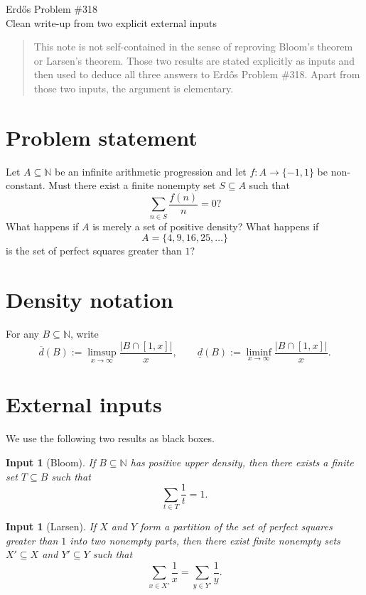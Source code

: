 \documentclass[11pt]{article}
\newtheorem{inputthm}[theorem]{Input}
\newcommand{\N}{\mathbb{N}}
\newcommand{\overd}{\overline d}
\newcommand{\underd}{\underline d}
\begin{document}
\begin{center}
{\LARGE Erd\H{o}s Problem \#318}\\[0.5em]
{\large Clean write-up from two explicit external inputs}
\end{center}

\begin{quote}
\small
This note is not self-contained in the sense of reproving Bloom's theorem or Larsen's theorem.
Those two results are stated explicitly as inputs and then used to deduce all three answers to
Erd\H{o}s Problem \#318. Apart from those two inputs, the argument is elementary.
\end{quote}

\section*{Problem statement}
Let $A\subseteq \N$ be an infinite arithmetic progression and let $f\colon A\to\{-1,1\}$ be non-constant.
Must there exist a finite nonempty set $S\subseteq A$ such that
\[
\sum_{n\in S}\frac{f(n)}{n}=0?
\]
What happens if $A$ is merely a set of positive density? What happens if
\[
A=\{4,9,16,25,\dots\}
\]
is the set of perfect squares greater than $1$?

\section*{Density notation}
For any $B\subseteq \N$, write
\[
\overd(B):=\limsup_{x\to\infty}\frac{|B\cap[1,x]|}{x},
\qquad
\underd(B):=\liminf_{x\to\infty}\frac{|B\cap[1,x]|}{x}.
\]

\section*{External inputs}
We use the following two results as black boxes.

\begin{inputthm}[Bloom]
If $B\subseteq \N$ has positive upper density, then there exists a finite set $T\subseteq B$ such that
\[
\sum_{t\in T}\frac1t=1.
\]
\end{inputthm}

\begin{inputthm}[Larsen]
If $X$ and $Y$ form a partition of the set of perfect squares greater than $1$ into two nonempty parts,
then there exist finite nonempty sets $X'\subseteq X$ and $Y'\subseteq Y$ such that
\[
\sum_{x\in X'}\frac1x=\sum_{y\in Y'}\frac1y.
\]
\end{inputthm}
\end{document}
